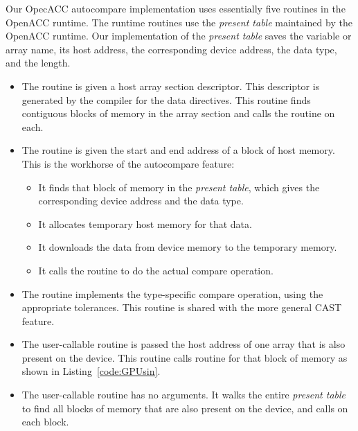 Our OpecACC autocompare implementation uses essentially five routines in the OpenACC runtime.
The runtime routines use the \emph{present table}\cite{wolfe.ashes.17} maintained by the OpenACC runtime.
Our implementation of the \emph{present table} saves the variable or array name, its host address, the corresponding device address, the data type, and the length.
\begin{itemize}
\item The  routine is given a host array section descriptor.
This descriptor is generated by the compiler for the data directives.
This routine finds contiguous blocks of memory in the array section and calls the  routine on each.
\item The  routine is given the start and end address of a block of host memory.
This is the workhorse of the autocompare feature:
\begin{itemize}
\item It finds that block of memory in the \emph{present table}, which gives the corresponding device address and the data type.
\item It allocates temporary host memory for that data.
\item It downloads the data from device memory to the temporary memory.
\item It calls the  routine to do the actual compare operation.
\end{itemize}
\item The  routine implements the type-specific compare operation, using the appropriate tolerances.
This routine is shared with the more general CAST feature.

\item The user-callable  routine is passed the host address of one array that is also present on the device.
This routine calls  routine for that block of memory as shown in Listing~\ref{code:GPUsin}.
\item The user-callable  routine has no arguments.
It walks the entire \emph{present table} to find all blocks of memory that are also present on the device, and calls  on each block.
\end{itemize}

